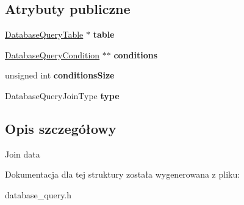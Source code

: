 \subsection*{Atrybuty publiczne}
\begin{DoxyCompactItemize}
\item 
\hyperlink{structsDatabaseQueryTable}{Database\+Query\+Table} $\ast$ {\bfseries table}\hypertarget{structsDatabaseQueryJoin_acbf5a41cfc09cd83a76141f6c9062917}{}\label{structsDatabaseQueryJoin_acbf5a41cfc09cd83a76141f6c9062917}

\item 
\hyperlink{structsDatabaseQueryCondition}{Database\+Query\+Condition} $\ast$$\ast$ {\bfseries conditions}\hypertarget{structsDatabaseQueryJoin_a0c9a74a0b86f72c5b70caae49d39fd05}{}\label{structsDatabaseQueryJoin_a0c9a74a0b86f72c5b70caae49d39fd05}

\item 
unsigned int {\bfseries conditions\+Size}\hypertarget{structsDatabaseQueryJoin_a5e0ea926de3b76b97479d26be2f5d935}{}\label{structsDatabaseQueryJoin_a5e0ea926de3b76b97479d26be2f5d935}

\item 
Database\+Query\+Join\+Type {\bfseries type}\hypertarget{structsDatabaseQueryJoin_ad0a33e6334f09c044be0d360d87cf21e}{}\label{structsDatabaseQueryJoin_ad0a33e6334f09c044be0d360d87cf21e}

\end{DoxyCompactItemize}


\subsection{Opis szczegółowy}
Join data 

Dokumentacja dla tej struktury została wygenerowana z pliku\+:\begin{DoxyCompactItemize}
\item 
database\+\_\+query.\+h\end{DoxyCompactItemize}

